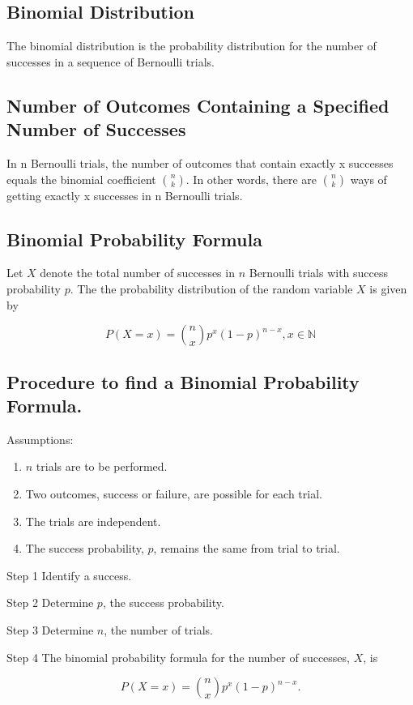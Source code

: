 \documentclass[12pt]{article}
\begin{document}
        \subsection*{Binomial Distribution}
            The binomial distribution is the probability distribution for the number of successes in a
            sequence of Bernoulli trials.
        \subsection*{Number of Outcomes Containing a Specified Number of Successes}
            In n Bernoulli trials, the number of outcomes that contain exactly x successes equals the
            binomial coefficient ${n \choose k}$. In other words, there are ${n \choose k}$ ways of getting
            exactly x successes in n Bernoulli trials.
        \subsection*{Binomial Probability Formula}
            Let $X$ denote the total number of successes in $n$ Bernoulli trials with success probability
            $p$. The the probability distribution of the random variable $X$ is given by
            \begin{center}
                \[
                    P(X = x) = {n \choose x}p^x(1 - p)^{n-x}, x \in \mathbb{N}
                \]
            \end{center}
        \subsection*{Procedure to find a Binomial Probability Formula.}
            Assumptions:
            \begin{enumerate}
                \item $n$ trials are to be performed.
                \item Two outcomes, success or failure, are possible for each trial.
                \item The trials are independent.
                \item The success probability, $p$, remains the same from trial to trial.                
            \end{enumerate}
            \begin{description}
                \item {Step 1} Identify a success.
                \item {Step 2} Determine $p$, the success probability.
                \item {Step 3} Determine $n$, the number of trials.
                \item {Step 4} The binomial probability formula for the number of successes, $X$, is
                \begin{center}
                    \[
                        P(X = x) = {n \choose x}p^x(1 - p)^{n-x}.    
                    \]
                \end{center}
            \end{description}
\end{document}
